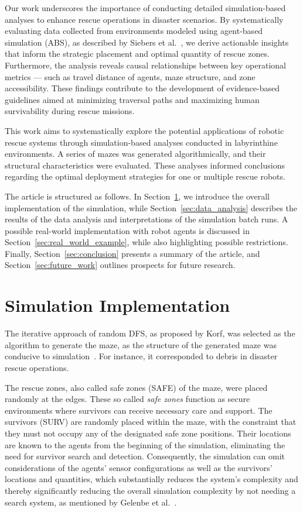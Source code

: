 \documentclass[3p,times,procedia]{elsarticle}
\begin{document}
Our work underscores the importance of conducting detailed simulation-based analyses to enhance rescue operations in disaster scenarios. By systematically evaluating data collected from environments modeled using agent-based simulation (ABS), as described by Siebers et al.\ \cite{siebers2008introduction}, we derive actionable insights that inform the strategic placement and optimal quantity of rescue zones. Furthermore, the analysis reveals causal relationships between key operational metrics — such as travel distance of agents, maze structure, and zone accessibility. These findings contribute to the development of evidence-based guidelines aimed at minimizing traversal paths and maximizing human survivability during rescue missions.

This work aims to systematically explore the potential applications of robotic rescue systems through simulation-based analyses conducted in labyrinthine environments. A series of mazes was generated algorithmically, and their structural characteristics were evaluated. These analyses informed conclusions regarding the optimal deployment strategies for one or multiple rescue robots.

The article is structured as follows.
In Section~\ref{sec:simulation_implementation}, we introduce the overall implementation of the simulation, while Section~\ref{sec:data_analysis} describes the results of the data analysis and interpretations of the simulation batch runs.
A possible real-world implementation with robot agents is discussed in Section~\ref{sec:real_world_example}, while also highlighting possible restrictions.
Finally, Section~\ref{sec:conclusion} presents a summary of the article, and Section~\ref{sec:future_work} outlines prospects for future research.

\section{Simulation Implementation}
\label{sec:simulation_implementation}

The iterative approach of random DFS, as proposed by Korf, was selected as the algorithm to generate the maze, as the structure of the generated maze was conducive to simulation\ \cite{KORF198597}.
For instance, it corresponded to debris in disaster rescue operations.

The rescue zones, also called safe zones (SAFE) of the maze, were placed randomly at the edges.
These so called \textit{safe zones} function as secure environments where survivors can receive necessary care and support.
The survivors (SURV) are randomly placed within the maze, with the constraint that they must not occupy any of the designated safe zone positions. Their locations are known to the agents from the beginning of the simulation, eliminating the need for survivor search and detection. Consequently, the simulation can omit considerations of the agents’ sensor configurations as well as the survivors’ locations and quantities, which substantially reduces the system’s complexity and thereby significantly reducing the overall simulation complexity by not needing a search system, as mentioned by Gelenbe et al.\ \cite{GELENBE2012Large}.
\end{document}
